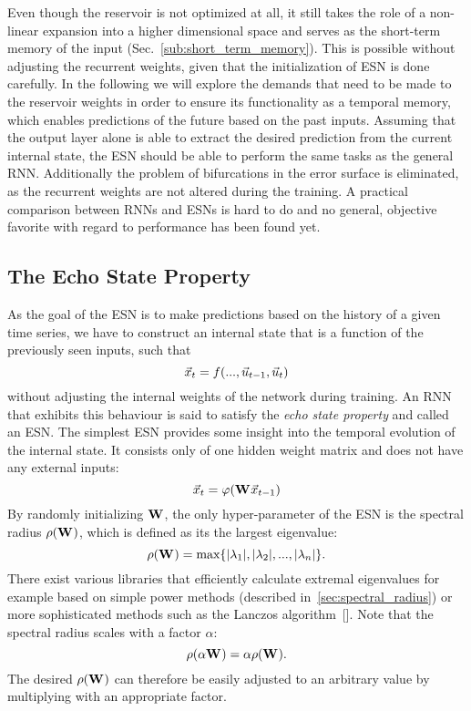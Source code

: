 Even though the reservoir is not optimized at all, it still takes the role of a
non-linear expansion into a higher dimensional space and serves as the
short-term memory of the input (Sec.~\ref{sub:short_term_memory}).  This is
possible without adjusting the recurrent weights, given that the initialization
of ESN is done carefully.  In the following we will explore the demands that
need to be made to the reservoir weights in order to ensure its functionality
as a temporal memory, which enables predictions of the future based on the past
inputs.  Assuming that the output layer alone is able to extract the desired
prediction from the current internal state, the ESN should be able to perform
the same tasks as the general RNN. Additionally the problem of bifurcations in
the error surface is eliminated, as the recurrent weights are not altered
during the training. A practical comparison between RNNs and ESNs is hard to do
and no general, objective favorite with regard to performance has been found
yet.


\subsection{The Echo State Property}
\label{sub:echo_state_property}

As the goal of the ESN is to make predictions based on the history of a given
time series, we have to construct an internal state that is a function of the
previously seen inputs, such that
\begin{equation}
  \label{eq:echo_func}
  \vec{x}_t = f(..., \vec{u}_{t-1}, \vec{u}_t)
\end{equation}
without adjusting the internal weights of the network during training.
An RNN that exhibits this behaviour is said to satisfy the \emph{echo state
property} and called an ESN.  The simplest ESN provides some insight into the
temporal evolution of the internal state. It consists only of one hidden weight
matrix and does not have any external inputs:
\begin{equation}
    \label{eq:state_space_hidden_only}
    \vec{x}_t = \varphi(\boldsymbol{\textbf{W}}^{\text{}} \vec{x}_{t-1})
\end{equation}
By randomly initializing $\boldsymbol{\textbf{W}}^{\text{}}$, the only hyper-parameter of the ESN is the
spectral radius $\rho(\boldsymbol{\textbf{W}}^{\text{}})$, which is defined as its the largest
eigenvalue:
\begin{equation}
  \rho(\boldsymbol{\textbf{W}}^{\text{}}) = \text{max} \{|\lambda_1|, |\lambda_2|, ..., |\lambda_n|\}.
\end{equation}
There exist various libraries that efficiently calculate extremal eigenvalues
for example based on simple power methods (described
in~\ref{sec:spectral_radius}) or more sophisticated methods such as the Lanczos
algorithm~[\cite{lanczos1950iteration}].  Note that the spectral radius scales
with a factor $\alpha$:
\begin{equation}
  \label{eq:spr_scale}
  \rho(\alpha \boldsymbol{\textbf{W}}^{\text{}}) = \alpha \rho(\boldsymbol{\textbf{W}}^{\text{}}).
\end{equation}
The desired $\rho(\boldsymbol{\textbf{W}}^{\text{}})$ can therefore be easily adjusted to an arbitrary
value by multiplying with an appropriate factor.


